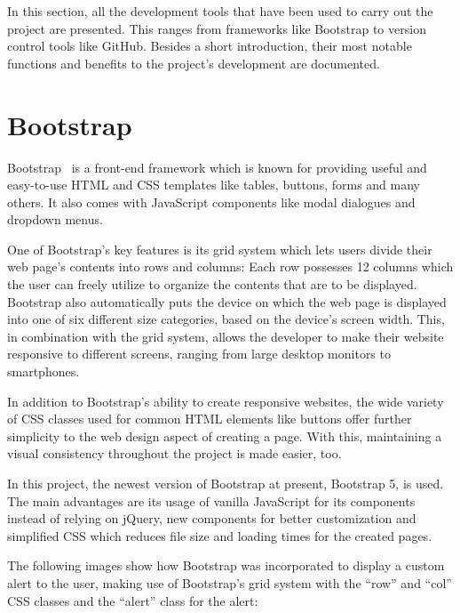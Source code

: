 
In this section, all the development tools that have been used to carry out the project are presented. This ranges from frameworks like Bootstrap to version control tools like GitHub. Besides a short introduction, their most notable functions and benefits to the project's development are documented.

\section{Bootstrap}
Bootstrap~\cite{bootstrap5_tutorial} is a front-end framework which is known for providing useful and easy-to-use HTML and CSS templates like tables, buttons, forms and many others. It also comes with JavaScript components like modal dialogues and dropdown menus.

One of Bootstrap's key features is its grid system which lets users divide their web page's contents into rows and columns:
Each row possesses 12 columns which the user can freely utilize to organize the contents that are to be displayed. Bootstrap also automatically puts the device on which the web page is displayed into one of six different size categories, based on the device's screen width. This, in combination with the grid system, allows the developer to make their website responsive to different screens, ranging from large desktop monitors to smartphones.

In addition to Bootstrap's ability to create responsive websites, the wide variety of CSS classes used for common HTML elements like buttons offer further simplicity to the web design aspect of creating a page. With this, maintaining a visual consistency throughout the project is made easier, too.

In this project, the newest version of Bootstrap at present, Bootstrap 5, is used. The main advantages are its usage of vanilla JavaScript for its components instead of relying on jQuery, new components for better customization and simplified CSS which reduces file size and loading times for the created pages.

The following images show how Bootstrap was incorporated to display a custom alert to the user, making use of Bootstrap's grid system with the ``row'' and ``col'' CSS classes and the ``alert'' class for the alert:

